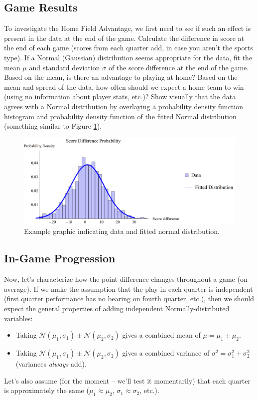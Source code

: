\documentclass{article}
\begin{document}
\subsection{Game Results}
\label{sec:results}
To investigate the Home Field Advantage, we first need to see if such an effect is present in the data at the end of the game. Calculate the difference in score at the end of each game
(scores from each quarter add, in case you aren't the sports type). If a Normal (Gaussian) distribution seems appropriate for the data, fit the mean $\mu$ and standard deviation $\sigma$
of the score difference at the end of the game. Based on the mean, is there an advantage to playing at home? Based on the mean and spread of the data, how often should we
expect a home team to win (using no information about player stats, etc.)? Show visually that the data agrees with a Normal distribution by overlaying a probability
density function histogram and probability density function of the fitted Normal distribution (something similar to Figure \ref{fig:normal}).

\begin{figure}
\begin{center}
\includegraphics[scale=.6]{normalfit.png}
\caption{Example graphic indicating data and fitted normal distribution.}
\label{fig:normal}
\end{center}
\end{figure}

\subsection{In-Game Progression}
\label{sec:progression}
Now, let's characterize how the point difference changes throughout a game (on average). If we make the assumption that the play in each quarter is independent
(first quarter performance has no bearing on fourth quarter, etc.), then we should expect the general properties of adding independent Normally-distributed variables:
\begin{itemize}
\item{Taking $\mathcal{N}(\mu_1,\sigma_1)\pm\mathcal{N}(\mu_2,\sigma_2)$ gives a combined mean of $\mu=\mu_1\pm\mu_2$.}
\item{Taking $\mathcal{N}(\mu_1,\sigma_1)\pm\mathcal{N}(\mu_2,\sigma_2)$ gives a combined variance of $\sigma^2=\sigma_1^2+\sigma_2^2$ (variances \textit{always} add).}
\end{itemize}
Let's also assume (for the moment -- we'll test it momentarily) that each quarter is approximately the same ($\mu_1\approx\mu_2$, $\sigma_1\approx\sigma_2$, etc.).
\end{document}
